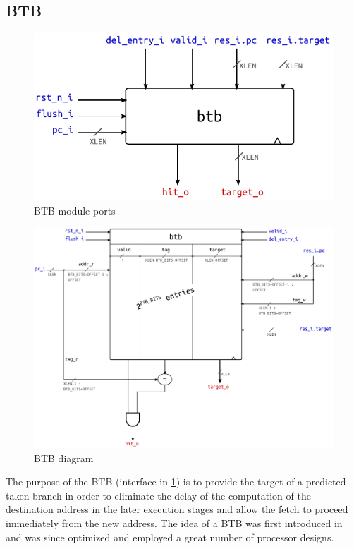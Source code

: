 \subsection{\acf{BTB}}\label{sec:btb}
\begin{figure}[hbt]
  \centering
  \includegraphics{img/btb-top.pdf}
  \caption{\acs{BTB} module ports}
  \label{fig:btb-top}
\end{figure}
\begin{figure}[hbt]
  \centering
  \includegraphics[width=\textwidth]{img/btb.pdf}
  \caption{\acs{BTB} diagram}
  \label{fig:btb}
\end{figure}
The purpose of the \ac{BTB} (interface in \cref{fig:btb-top}) is to provide the target of a predicted taken branch in order to eliminate the delay of the computation of the destination address in the later execution stages and allow the fetch to proceed immediately from the new address. The idea of a \ac{BTB} was first introduced in \cite{lee84} and was since optimized and employed a great number of processor designs.

